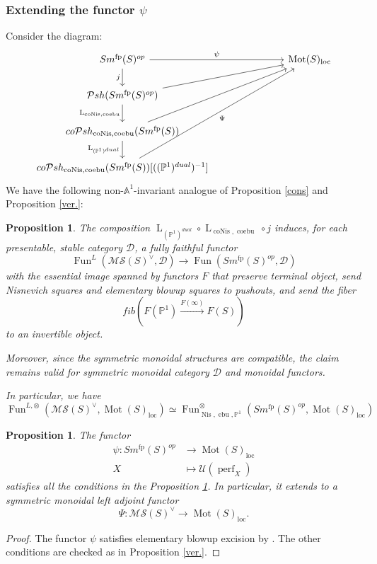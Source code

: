 \documentclass{article}
\newtheorem{prop}[thm]{Proposition}
\theoremstyle{definition}
\newcommand{\on}{\operatorname}
\begin{document}
\subsubsection{Extending the functor $\psi$}
Consider the diagram:
\[\begin{tikzcd}
	{Sm^{\on{fp}}(S)^{op}} &&& {\operatorname{Mot}(S)_{\operatorname{loc}}} \\
	{\mathcal{P}sh(Sm^{\on{fp}}(S)^{op})} \\
	{co\mathcal{P}sh_{\operatorname{coNis},\operatorname{coebu}}(Sm^{\on{fp}}(S))} \\
	{co\mathcal{P}sh_{\operatorname{coNis},\operatorname{coebu}}(Sm^{\on{fp}}(S))[((\mathbb{P}^1)^{dual})^{-1}]}
	\arrow["\psi", from=1-1, to=1-4]
	\arrow["j"', from=1-1, to=2-1]
	\arrow[from=2-1, to=1-4]
	\arrow["{\on{L}_{\on{coNis},\on{coebu}}}"', from=2-1, to=3-1]
	\arrow[from=3-1, to=1-4]
	\arrow["{\operatorname{L}_{(\mathbb{P}^1)^{dual}}}"', from=3-1, to=4-1]
	\arrow["\Psi"', from=4-1, to=1-4]
\end{tikzcd}\]
We have the following non-$\mathbb{A}^1$-invariant analogue of Proposition \ref{cons} and Proposition \ref{ver.}:
\begin{prop}\label{cons`}
The composition $\on{L}_{(\mathbb{P}^1)^{dual}}\circ\on{L}_{\on{coNis},\on{coebu}}\circ j$ induces, for each presentable, stable category $\mathcal{D}$, a fully faithful functor\[
\on{Fun}^L(\mathcal{MS}(S)^\vee,\mathcal{D})\rightarrow\on{Fun}(Sm^{\on{fp}}(S)^{op},\mathcal{D})
\]
with the essential image spanned by functors $F$ that preserve terminal object, send Nisnevich squares and elementary blowup squares to pushouts, and send the fiber\[fib(F(\mathbb{P}^1)\xrightarrow{F(\infty)}F(S))\]
to an invertible object.


Moreover, since the symmetric monoidal structures are compatible, the claim remains valid for symmetric monoidal category $\mathcal{D}$ and monoidal functors.


In particular, we have\[\on{Fun}^{L,\otimes}(\mathcal{MS}(S)^\vee,\on{Mot}(S)_{\on{loc}})\simeq\on{Fun}^{\otimes}_{\on{Nis},\on{ebu},\mathbb{P}^1}(Sm^{\on{fp}}(S)^{op},\on{Mot}(S)_{\on{loc}})
\]
\end{prop}
\begin{prop}\label{ver.ms}
The functor\[
\begin{aligned}
\psi: Sm^{\on{fp}}(S)^{op} &\rightarrow \on{Mot}(S)_{\on{loc}}\\
 X & \mapsto \mathcal{U}(\on{perf}_X)
 \end{aligned}\]
satisfies all the conditions in the Proposition \ref{cons`}. In particular, it extends to a symmetric monoidal left adjoint functor \[ \Psi:\mathcal{MS}(S)^\vee \rightarrow \on{Mot}(S)_{\on{loc}}.
\]
\end{prop}
\begin{proof}
The functor $\psi$ satisfies elementary blowup excision by \cite[Theorem A]{Kha}. The other conditions are checked as in Proposition \ref{ver.}.
\end{proof}
\end{document}
